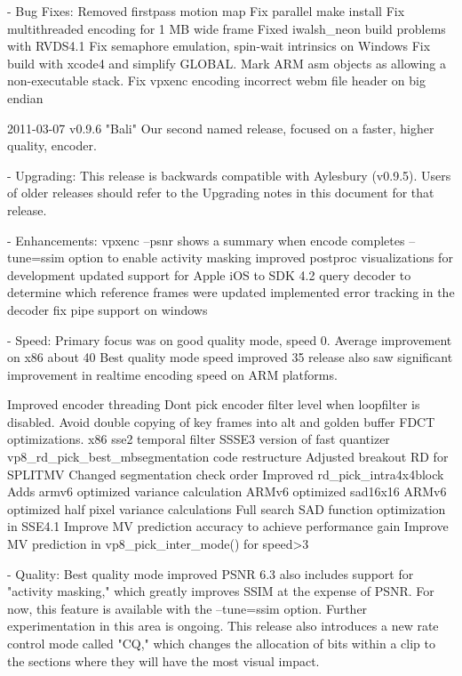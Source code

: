 \begin{DoxyVerbInclude}
  - Bug Fixes:
          Removed firstpass motion map
          Fix parallel make install
          Fix multithreaded encoding for 1 MB wide frame
          Fixed iwalsh_neon build problems with RVDS4.1
          Fix semaphore emulation, spin-wait intrinsics on Windows
          Fix build with xcode4 and simplify GLOBAL.
          Mark ARM asm objects as allowing a non-executable stack.
          Fix vpxenc encoding incorrect webm file header on big endian


2011-03-07 v0.9.6 "Bali"
  Our second named release, focused on a faster, higher quality, encoder.

  - Upgrading:
    This release is backwards compatible with Aylesbury (v0.9.5). Users
    of older releases should refer to the Upgrading notes in this
    document for that release.

  - Enhancements:
      vpxenc --psnr shows a summary when encode completes
      --tune=ssim option to enable activity masking
      improved postproc visualizations for development
      updated support for Apple iOS to SDK 4.2
      query decoder to determine which reference frames were updated
      implemented error tracking in the decoder
      fix pipe support on windows

  - Speed:
      Primary focus was on good quality mode, speed 0. Average improvement
      on x86 about 40%
      Best quality mode speed improved 35%
      release also saw significant improvement in realtime encoding speed
      on ARM platforms.

        Improved encoder threading
        Dont pick encoder filter level when loopfilter is disabled.
        Avoid double copying of key frames into alt and golden buffer
        FDCT optimizations.
        x86 sse2 temporal filter
        SSSE3 version of fast quantizer
        vp8_rd_pick_best_mbsegmentation code restructure
        Adjusted breakout RD for SPLITMV
        Changed segmentation check order
        Improved rd_pick_intra4x4block
        Adds armv6 optimized variance calculation
        ARMv6 optimized sad16x16
        ARMv6 optimized half pixel variance calculations
        Full search SAD function optimization in SSE4.1
        Improve MV prediction accuracy to achieve performance gain
        Improve MV prediction in vp8_pick_inter_mode() for speed>3

  - Quality:
      Best quality mode improved PSNR 6.3%
      also includes support for "activity masking," which greatly improves
      SSIM at the expense of PSNR. For now, this feature is available with
      the --tune=ssim option. Further experimentation in this area
      is ongoing. This release also introduces a new rate control mode
      called "CQ," which changes the allocation of bits within a clip to
      the sections where they will have the most visual impact.


\end{DoxyVerbInclude}
